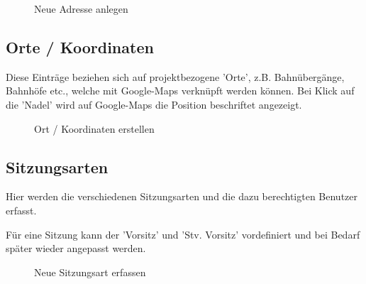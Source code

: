 \begin{figure}[H]
\caption{Neue Adresse anlegen}
\end{figure}

\subsection{Orte / Koordinaten}

Diese Einträge beziehen sich auf projektbezogene 'Orte', z.B. Bahnübergänge, Bahnhöfe etc., welche mit Google-Maps verknüpft werden können. Bei Klick auf die 'Nadel' wird auf Google-Maps die Position beschriftet angezeigt.

\begin{figure}[H]
\caption{Ort / Koordinaten erstellen}
\end{figure}

\clearpage
\subsection{Sitzungsarten}

Hier werden die verschiedenen Sitzungsarten und die dazu berechtigten Benutzer erfasst.

\vspace{\baselineskip}


Für eine Sitzung kann der 'Vorsitz' und 'Stv. Vorsitz' vordefiniert und bei Bedarf später wieder angepasst
werden.

\begin{figure}[H]
\caption{Neue Sitzungsart erfassen}
\end{figure}

